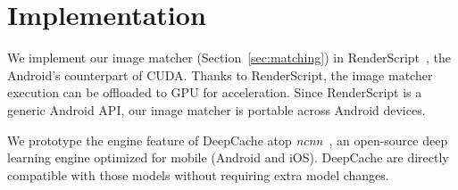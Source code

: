 \documentclass[10pt,acmtog]{acmart}
\newcommand{\framework}{DeepCache\xspace}
\newcommand{\sys}{\framework{}}
\begin{document}
\section{Implementation}\label{sec:impl}

We implement our image matcher (Section~\ref{sec:matching}) in RenderScript~\cite{RenderScript}, the Android's counterpart of CUDA. 
Thanks to RenderScript, the image matcher execution can be offloaded to GPU for acceleration. 
Since RenderScript is a generic Android API, our image matcher is portable across Android devices. 

We prototype the engine feature of \sys{} atop \emph{ncnn}~\cite{ncnn}, an open-source deep learning engine optimized for mobile (Android and iOS).
\framework are directly compatible with those models without requiring extra model changes.
\end{document}
